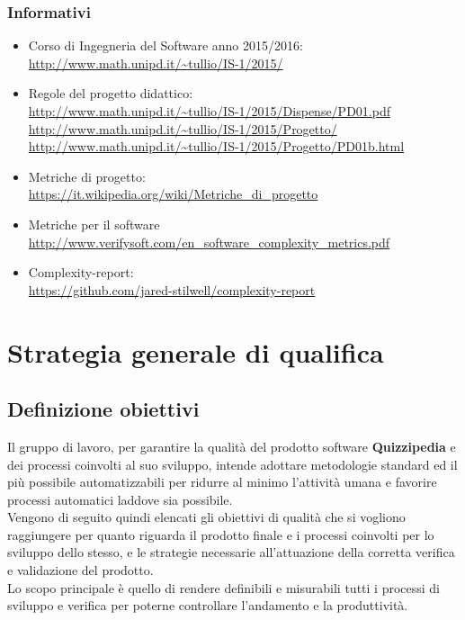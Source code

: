 \documentclass[a4paper,11pt]{article}
\begin{document}
		\subsubsection{Informativi}
		\begin{itemize}
			\item Corso di Ingegneria del Software anno 2015/2016:\\
			\url{http://www.math.unipd.it/~tullio/IS-1/2015/}
			\item Regole del progetto didattico:\\
			\url{http://www.math.unipd.it/~tullio/IS-1/2015/Dispense/PD01.pdf}
			\url{http://www.math.unipd.it/~tullio/IS-1/2015/Progetto/}\\
			\url{http://www.math.unipd.it/~tullio/IS-1/2015/Progetto/PD01b.html}
			\item Metriche di progetto:\\ 
			\url{https://it.wikipedia.org/wiki/Metriche_di_progetto}
			\item Metriche per il software\\
			\url{http://www.verifysoft.com/en_software_complexity_metrics.pdf}
			\item Complexity-report:\\
			\url{https://github.com/jared-stilwell/complexity-report}
		\end{itemize}
	\pagebreak
	
\newpage

\section{Strategia generale di qualifica}
\subsection{Definizione obiettivi}
Il gruppo di lavoro, per garantire la qualità del prodotto software \textbf{Quizzipedia} e dei processi coinvolti al suo sviluppo, intende adottare metodologie standard ed il più possibile automatizzabili per ridurre al minimo l'attività umana e favorire processi automatici laddove sia possibile.\\
Vengono di seguito quindi elencati gli obiettivi di qualità che si vogliono raggiungere per quanto riguarda il prodotto finale e i processi coinvolti per lo sviluppo dello stesso, e le strategie necessarie all'attuazione della corretta verifica e validazione del prodotto.\\
Lo scopo principale è quello di rendere definibili e misurabili tutti i processi di sviluppo e verifica per poterne controllare l'andamento e la produttività. 
\end{document}
